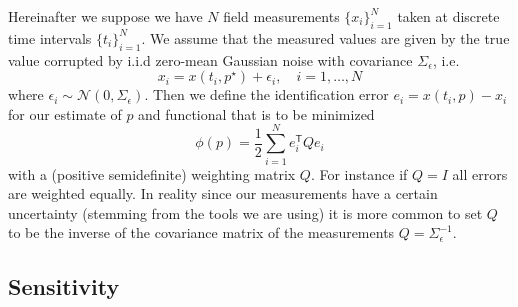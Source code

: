 \documentclass[a4paper]{article}
\newcommand{\T}{\mathsf{T}}
\theoremstyle{plain}
\theoremstyle{definition}
\theoremstyle{remark}
\begin{document}
Hereinafter we suppose we have $N$ field measurements $\{x_i\}_{i=1}^N$ taken
at discrete time intervals $\{t_i\}_{i=1}^N$. We assume that the measured
values are given by the true value corrupted by i.i.d zero-mean Gaussian noise
with covariance $\Sigma_\epsilon$, i.e.
\begin{equation} \label{eqn:measurement-model}
  x_i = x(t_i, p^\star) + \epsilon_i, \quad i = 1, \ldots, N
\end{equation}
where  $\epsilon_i \sim \mathcal{N}(0, \Sigma_\epsilon)$. Then we define the
identification error $e_i = x(t_i, p) - x_i$ for our estimate of $p$ and
functional that is to be minimized
\[
  \phi(p) = \frac{1}{2} \sum_{i=1}^N e_i^\T Q e_i
\]
with a (positive semidefinite) weighting matrix $Q$. For instance if $Q = I$
all errors are weighted equally. In reality since our measurements have a
certain uncertainty (stemming from the tools we are using) it is more common
to set $Q$ to be the inverse of the covariance matrix of the measurements $Q =
\Sigma_\epsilon^{-1}$.

\subsection{Sensitivity}
\end{document}
